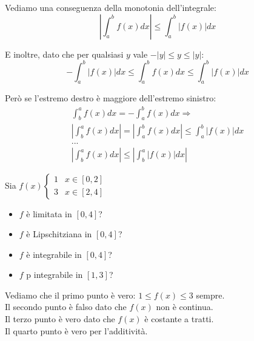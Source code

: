 \begin{osservazione}
    Vediamo una conseguenza della monotonia dell'integrale:
    \begin{equation}
        \left\vert \int_{a}^{b} f(x) dx \right\vert \leq \int_{a}^{b} |f(x)| dx
    \end{equation}

    E inoltre, dato che per qualsiasi $y$ vale $-|y|\leq y\leq |y|$:
    \begin{equation}
        - \int_{a}^{b} |f(x)| dx \leq \int_{a}^{b} f(x) dx \leq \int_{a}^{b} |f(x)| dx
    \end{equation}

    Però se l'estremo destro è maggiore dell'estremo sinistro:
    \begin{gather}
        \int_{b}^{a} f(x) dx = - \int_{a}^{b} f(x) dx \Rightarrow \\
        \left\vert \int_{b}^{a} f(x) dx \right\vert = \left\vert \int_{a}^{b} f(x) dx \right\vert \leq \int_{a}^{b} |f(x)| dx \\
        ... \\
        \left\vert \int_{b}^{a} f(x) dx \right\vert \leq \left\vert \int_{b}^{a} |f(x)| dx \right\vert
    \end{gather}
\end{osservazione}

\begin{esercizio}
    Sia $f(x) \begin{cases}
        1 & x\in[0,2] \\
        3 & x\in[2,4]
    \end{cases}$

    \begin{itemize}
        \item $f$ è limitata in $[0,4]$?
        \item $f$ è Lipschitziana in $[0,4]$?
        \item $f$ è integrabile in $[0,4]$?
        \item $f$ p integrabile in $[1,3]$?
    \end{itemize}

    Vediamo che il primo punto è vero: $1\leq f(x)\leq 3$ sempre.\\
    Il secondo punto è falso dato che $f(x)$ non è continua. \\
    Il terzo punto è vero dato che $f(x)$ è costante a tratti. \\
    Il quarto punto è vero per l'additività.
\end{esercizio}

